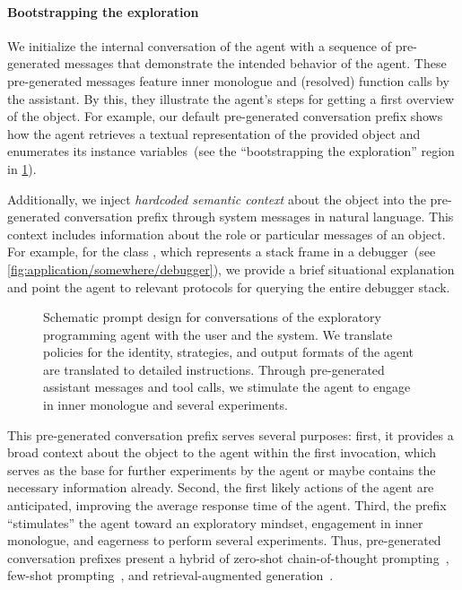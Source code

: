 \paragraph*{Bootstrapping the exploration}
We initialize the internal conversation of the agent with a sequence of pre-generated messages that demonstrate the intended behavior of the agent.
These pre-generated messages feature inner monologue and (resolved) function calls by the assistant.
By this, they illustrate the agent's steps for getting a first overview of the object.
For example, our default pre-generated conversation prefix shows how the agent retrieves a textual representation of the provided object and enumerates its instance variables~(see the ``bootstrapping the exploration'' region in \cref{fig:agent/prompts/design}).

Additionally, we inject \emph{hardcoded semantic context} about the object into the pre-generated conversation prefix through system messages in natural language.
This context includes information about the role or particular messages of an object.
For example, for the class , which represents a stack frame in a debugger~(see \cref{fig:application/somewhere/debugger}), we provide a brief situational explanation and point the agent to relevant protocols for querying the entire debugger stack.

\begin{figure}
	\centering
	\begin{threeparttable}
		\centering
		{\footnotesize
		}
	\end{threeparttable}
	\caption[Schematic prompt design for conversations of the exploratory programming agent with the user and the system.]{
		Schematic prompt design for conversations of the exploratory programming agent with the user and the system.
		We translate policies for the identity, strategies, and output formats of the agent are translated to detailed instructions.
		Through pre-generated assistant messages and tool calls, we stimulate the agent to engage in inner monologue and several experiments.
	}
	\label{fig:agent/prompts/design}
\end{figure}

This pre-generated conversation prefix serves several purposes:
first, it provides a broad context about the object to the agent within the first invocation, which serves as the base for further experiments by the agent or maybe contains the necessary information already.
Second, the first likely actions of the agent are anticipated, improving the average response time of the agent.
Third, the prefix ``stimulates'' the agent toward an exploratory mindset, engagement in inner monologue, and eagerness to perform several experiments.
Thus, pre-generated conversation prefixes present a hybrid of zero-shot chain-of-thought prompting~\cite{kojima2022large}, few-shot prompting~\cite{brown2020language}, and retrieval-augmented generation~\cite{lewis2020retrieval}.

